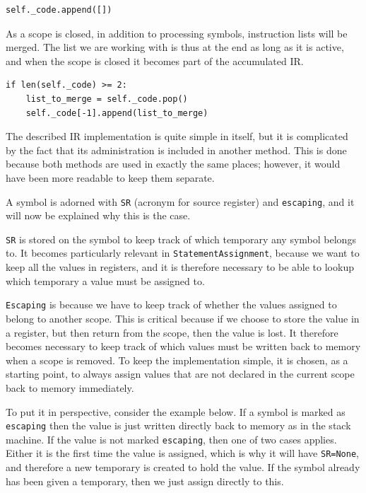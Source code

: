 \begin{verbatim}
self._code.append([])
\end{verbatim}

As a scope is closed, in addition to processing symbols, instruction lists will be merged. The list we are working with is thus at the end as long as it is active, and when the scope is closed it becomes part of the accumulated IR.

\begin{verbatim}
if len(self._code) >= 2:
    list_to_merge = self._code.pop()
    self._code[-1].append(list_to_merge)
\end{verbatim}

The described IR implementation is quite simple in itself, but it is complicated by the fact that its administration is included in another method. This is done because both methods are used in exactly the same places; however, it would have been more readable to keep them separate.

A symbol is adorned with \texttt{SR} (acronym for source register) and \texttt{escaping}, and it will now be explained why this is the case.

\texttt{SR} is stored on the symbol to keep track of which temporary any symbol belongs to. It becomes particularly relevant in \texttt{StatementAssignment}, because we want to keep all the values in registers, and it is therefore necessary to be able to lookup which temporary a value must be assigned to.

\texttt{Escaping} is because we have to keep track of whether the values assigned to belong to another scope. This is critical because if we choose to store the value in a register, but then return from the scope, then the value is lost. It therefore becomes necessary to keep track of which values must be written back to memory when a scope is removed. To keep the implementation simple, it is chosen, as a starting point, to always assign values that are not declared in the current scope back to memory immediately.

To put it in perspective, consider the example below. If a symbol is marked as \texttt{escaping} then the value is just written directly back to memory as in the stack machine. If the value is not marked \texttt{escaping}, then one of two cases applies. Either it is the first time the value is assigned, which is why it will have \texttt{SR=None}, and therefore a new temporary is created to hold the value. If the symbol already has been given a temporary, then we just assign directly to this.

